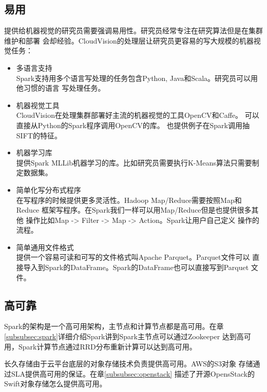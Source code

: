 \subsection{易用}
提供给机器视觉的研究员需要强调易用性。研究员经常专注在研究算法但是在集群维护和部署
会却经验。CloudVision的处理层让研究员更容易的写大规模的机器视觉任务：
\begin{itemize}
  \item 多语言支持 \\
        Spark支持用多个语言写处理的任务包含Python, Java和Scala。研究员可以用他习惯的语言
        写处理任务。
  \item 机器视觉工具 \\
        CloudVision在处理集群部署好主流的机器视觉的工具OpenCV和Caffe。
        可以直接从Python的Spark程序调用OpenCV的库。
        也提供例子在Spark调用抽SIFT的特征。
  \item 机器学习库 \\
        提供Spark MLLib机器学习的库。比如研究员需要执行K-Means算法只需要制定数据集。
  \item 简单化写分布式程序 \\
        在写程序的时候提供更多灵活性。Hadoop Map/Reduce需要按照Map和Reduce
        框架写程序。在Spark我们一样可以用Map/Reduce但是也提供很多其他
        操作比如Map -> Filter -> Map -> Action。Spark让用户自己定义
        操作的流程。
  \item 简单通用文件格式 \\
        提供一个容易可读和可写的文件格式叫Apache Parquet。Parquet文件可以
        直接导入到Spark的DataFrame。Spark的DataFrame也可以直接写到Parquet
        文件。
\end{itemize}


\subsection{高可靠}
Spark的架构是一个高可用架构，主节点和计算节点都是高可用。在章
\ref{subsubsec:spark}详细介绍Spark讲到Spark主节点可以通过Zookeeper
达到高可用，Spark计算节点通过RRD分布重新计算可以达到高可用。

长久存储由于云平台底层的对象存储技术负责提供高可用。AWS的S3对象
存储通过SLA提供高可用的保证。在章\ref{subsubsec:openstack}
描述了开源OpensStack的Swift对象存储怎么提供高可用。

